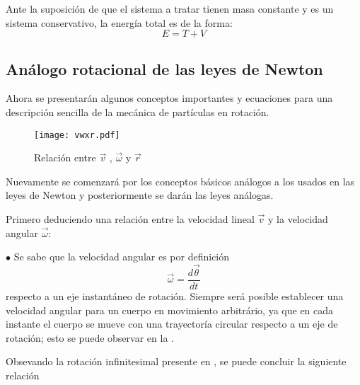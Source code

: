\documentclass[/home/hernan/Documentos/Apuntes_mecanica_teorica/main.tex]{subfiles}
\begin{document}
	\begin{definition}
		Ante la suposición de que el sistema a tratar tienen masa constante y es un sistema conservativo, la energía total es de la forma:
		\begin{equation}
			E = T + V
			\label{eq: Energy}
		\end{equation}
		
	\end{definition}

	\subsection{Análogo rotacional de las leyes de Newton}

	Ahora se presentarán algunos conceptos importantes y ecuaciones para una descripción sencilla de la mecánica de partículas en rotación. 	
	\begin{marginfigure}
		\begin{figure}[H]
			\texttt{[image: vwxr.pdf]}
			\caption{Relación entre $\vec{v}$ , $\vec{\omega}$ y $\vec{r}$}
			\label{fig: vwxr}
		\end{figure}
	\end{marginfigure}
	Nuevamente se comenzará por los conceptos básicos análogos a los usados en las leyes de Newton y posteriormente se darán las leyes análogas.



	Primero deduciendo una relación entre la velocidad lineal $\vec{v}$ y la velocidad angular $\vec{\omega}$:

	$\bullet$ Se sabe que la velocidad angular es por definición
	\begin{equation}
		\vec{\omega}= \frac{d \vec{\theta}}{dt}
	\end{equation}
	respecto a un eje instantáneo de rotación. Siempre será posible establecer una velocidad angular para un cuerpo en movimiento arbitrário, ya que en cada instante el cuerpo se mueve con una trayectoría circular respecto a un eje de rotación; esto se puede observar en la .


	Obsevando la rotación infinitesimal presente en , se puede concluir la siguiente relación 
	
\end{document}
